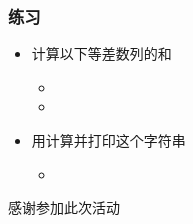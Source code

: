 \begin{CJK}{UTF8}{gbsn}
\begin{frame} [fragile]
	\frametitle{练习}
	\linespread{1.5}
	\begin{itemize}
	\item 计算以下等差数列的和
		\begin{itemize}
		\item {}
		\item {}
		\end{itemize}
	\item 用计算并打印这个字符串
		\begin{itemize}
		\item {}
		\end{itemize}
	\end{itemize}
\end{frame}

\PreLastFrame
\begin{frame}
	\centerline{\fontsize{32}{32}\selectfont 感谢参加此次活动}
\end{frame}

\newpage
\end{CJK}


